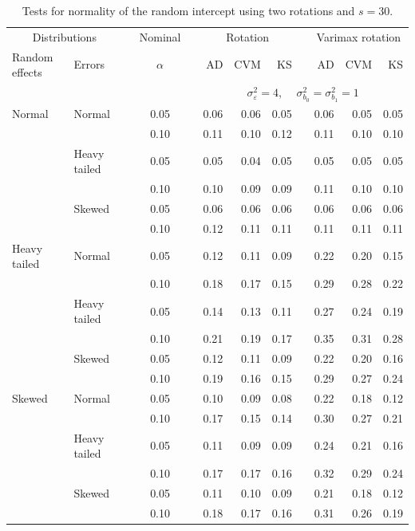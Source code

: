 \documentclass[12pt]{article} %
\begin{document}
\begin{table}[ht]
\caption{Tests for normality of the random intercept using two rotations and $s = 30$.}
\begin{scriptsize}
\begin{center}
\begin{tabular}{ll p{.1cm} c p{.1cm} rrr p{.1cm} rrr}
  \hline
  \multicolumn{2}{c}{Distributions}& & Nominal & &  \multicolumn{3}{c}{Rotation} & & \multicolumn{3}{c}{Varimax rotation} \\ \cline{1-2} \cline{6-8} \cline{10-12}   
  Random effects & Errors & & $\alpha$ & & AD & CVM & KS & & AD & CVM & KS \\ 
   \hline
& && && \multicolumn{7}{c}{$\sigma_{\varepsilon}^2 = 4$, \ \ $\sigma_{b_0}^2 = \sigma_{b_1}^2 = 1$} \\ \cline{6-12}
Normal       & Normal       && 0.05 &&  0.06 & 0.06 & 0.05 && 0.06 & 0.05 & 0.05 \\ 
             &              && 0.10 &&  0.11 & 0.10 & 0.12 && 0.11 & 0.10 & 0.10 \\ 
             & Heavy tailed && 0.05 &&  0.05 & 0.04 & 0.05 && 0.05 & 0.05 & 0.05 \\ 
             &              && 0.10 &&  0.10 & 0.09 & 0.09 && 0.11 & 0.10 & 0.10 \\ 
             & Skewed       && 0.05 &&  0.06 & 0.06 & 0.06 && 0.06 & 0.06 & 0.06 \\ 
             &              && 0.10 &&  0.12 & 0.11 & 0.11 && 0.11 & 0.11 & 0.11 \\ 
Heavy tailed & Normal       && 0.05 &&  0.12 & 0.11 & 0.09 && 0.22 & 0.20 & 0.15 \\ 
             &              && 0.10 &&  0.18 & 0.17 & 0.15 && 0.29 & 0.28 & 0.22 \\ 
             & Heavy tailed && 0.05 &&  0.14 & 0.13 & 0.11 && 0.27 & 0.24 & 0.19 \\ 
             &              && 0.10 &&  0.21 & 0.19 & 0.17 && 0.35 & 0.31 & 0.28 \\ 
             & Skewed       && 0.05 &&  0.12 & 0.11 & 0.09 && 0.22 & 0.20 & 0.16 \\ 
             &              && 0.10 &&  0.19 & 0.16 & 0.15 && 0.29 & 0.27 & 0.24 \\ 
Skewed       & Normal       && 0.05 &&  0.10 & 0.09 & 0.08 && 0.22 & 0.18 & 0.12 \\ 
             &              && 0.10 &&  0.17 & 0.15 & 0.14 && 0.30 & 0.27 & 0.21 \\ 
             & Heavy tailed && 0.05 &&  0.11 & 0.09 & 0.09 && 0.24 & 0.21 & 0.16 \\ 
             &              && 0.10 &&  0.17 & 0.17 & 0.16 && 0.32 & 0.29 & 0.24 \\ 
             & Skewed       && 0.05 &&  0.11 & 0.10 & 0.09 && 0.21 & 0.18 & 0.12 \\ 
             &              && 0.10 &&  0.18 & 0.17 & 0.16 && 0.31 & 0.26 & 0.19 \\ 


\end{tabular}
\end{center}
\end{scriptsize}
\end{table}
\end{document}

